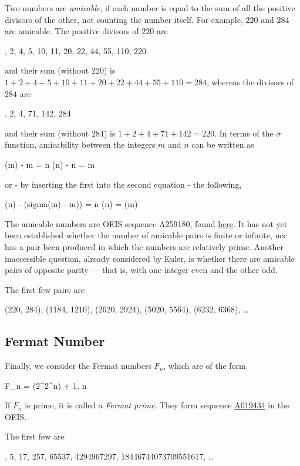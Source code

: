 Two numbers are \emph{amicable}, if each number is equal to the sum of all the positive divisors of the other, not counting the number itself. For example, $220$ and $284$ are amicable. The positive divisors of $220$ are

, 2, 4, 5, 10, 11, 20, 22, 44, 55, 110, 220
\eee

and their sum (without $220$) is $1+2+4+5+10+11+20+22+44+55+110 = 284$, whereas the divisors of $284$ are

, 2, 4, 71, 142, 284
\eee

and their sum (without $284$) is $1+2+4+71+142 = 220$. In terms of the $\sigma$ function, amicability between the integers $m$ and $n$ can be written as

\bee
\sigma(m) - m = n \quad \sigma(n) - n = m
\eee

or - by inserting the first into the second equation - the following,

\bee
\sigma(n) - (sigma(m) - m)) = n \rightarrow \sigma(n) = \sigma(m)
\eee

The amicable numbers are OEIS sequence A259180, found \href{https://oeis.org/A259180}{here}. It has not yet been established whether the number of amicable pairs is ﬁnite or inﬁnite, nor has a pair been produced in which the numbers are relatively prime. Another inaccessible question, already considered by Euler, is whether there are amicable pairs of opposite parity — that is, with one integer even and the other odd.

The first few pairs are

\bee
(220, 284), (1184, 1210), (2620, 2924), (5020, 5564), (6232, 6368), \ldots
\eee

\subsection{Fermat Number}

Finally, we consider the Fermat numbers $F_n$, which are of the form

\bee
F_n = (2^{2^n}) + 1, \quad n 
\eee

If $F_n$ is prime, it is called a \emph{Fermat prime}. They form sequence \href{https://oeis.org/A019434}{A019434} in the OEIS.

The first few are

, 5, 17, 257, 65537, 4294967297, 18446744073709551617, \ldots
\eee



